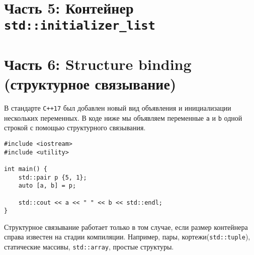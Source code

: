 \documentclass{article}
\begin{document}
\newpage
\section*{Часть 5: Контейнер \texttt{std::initializer\_list}}

\newpage
\section*{Часть 6: Structure binding (структурное связывание)}
В стандарте \texttt{C++17} был добавлен новый вид объявления и инициализации нескольких переменных. В коде ниже мы объявляем переменные \texttt{a} и \texttt{b} одной строкой с помощью структурного связывания.
\begin{lstlisting}
#include <iostream>
#include <utility>

int main() {
    std::pair p {5, 1};
    auto [a, b] = p;
    
    std::cout << a << " " << b << std::endl;
}
\end{lstlisting}
Структурное связывание работает только в том случае, если размер контейнера справа известен на стадии компиляции. Например, пары, кортежи(\texttt{std::tuple}), статические массивы, \texttt{std::array}, простые структуры.
\end{document}

